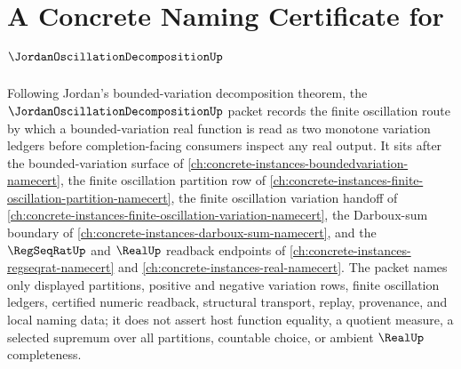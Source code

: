 \chapter{A Concrete Naming Certificate for $\JordanOscillationDecompositionUp$}
\label{ch:concrete-instances-jordan-oscillation-decomposition-namecert}

Following Jordan's bounded-variation decomposition theorem, the $\JordanOscillationDecompositionUp$ packet records the finite oscillation route by which a bounded-variation real function is read as two monotone variation ledgers before completion-facing consumers inspect any real output. It sits after the bounded-variation surface of \autoref{ch:concrete-instances-boundedvariation-namecert}, the finite oscillation partition row of \autoref{ch:concrete-instances-finite-oscillation-partition-namecert}, the finite oscillation variation handoff of \autoref{ch:concrete-instances-finite-oscillation-variation-namecert}, the Darboux-sum boundary of \autoref{ch:concrete-instances-darboux-sum-namecert}, and the $\RegSeqRatUp$ and $\RealUp$ readback endpoints of \autoref{ch:concrete-instances-regseqrat-namecert} and \autoref{ch:concrete-instances-real-namecert}. The packet names only displayed partitions, positive and negative variation rows, finite oscillation ledgers, certified numeric readback, structural transport, replay, provenance, and local naming data; it does not assert host function equality, a quotient measure, a selected supremum over all partitions, countable choice, or ambient $\RealUp$ completeness.

